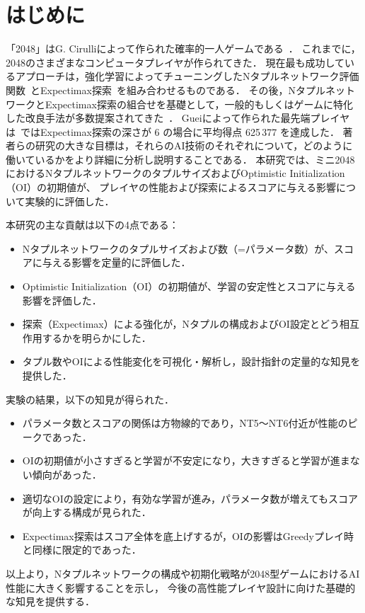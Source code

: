 \section{はじめに}
「2048」はG. Cirulliによって作られた確率的一人ゲームである~\cite{2048}．
これまでに，2048のさまざまなコンピュータプレイヤが作られてきた．
現在最も成功しているアプローチは，強化学習によってチューニングしたNタプルネットワーク評価関数~\cite{SzJa14}とExpectimax探索~\cite{YWHC16}を組み合わせるものである．
その後，NタプルネットワークとExpectimax探索の組合せを基礎として，一般的もしくはゲームに特化した改良手法が多数提案されてきた~\cite{YWHC16,Mats17,Jask17,GuCW22}．
Gueiによって作られた最先端プレイヤは~\cite{GuCW22}ではExpectimax探索の深さが 6 の場合に平均得点 625\,377 を達成した．
著者らの研究の大きな目標は，それらのAI技術のそれぞれについて，どのように働いているかをより詳細に分析し説明することである．
本研究では、ミニ2048におけるNタプルネットワークのタプルサイズおよびOptimistic Initialization（OI）の初期値が、
プレイヤの性能および探索によるスコアに与える影響について実験的に評価した．

\vspace{0.5em}
\noindent 本研究の主な貢献は以下の4点である：
\begin{itemize}
\item Nタプルネットワークのタプルサイズおよび数（=パラメータ数）が、スコアに与える影響を定量的に評価した．
\item Optimistic Initialization（OI）の初期値が、学習の安定性とスコアに与える影響を評価した．
\item 探索（Expectimax）による強化が，Nタプルの構成およびOI設定とどう相互作用するかを明らかにした．
\item タプル数やOIによる性能変化を可視化・解析し，設計指針の定量的な知見を提供した．
\end{itemize}

実験の結果，以下の知見が得られた．
\begin{itemize}
\item パラメータ数とスコアの関係は方物線的であり，NT5～NT6付近が性能のピークであった．
\item OIの初期値が小さすぎると学習が不安定になり，大きすぎると学習が進まない傾向があった．
\item 適切なOIの設定により，有効な学習が進み，パラメータ数が増えてもスコアが向上する構成が見られた．
\item Expectimax探索はスコア全体を底上げするが，OIの影響はGreedyプレイ時と同様に限定的であった．
\end{itemize}

以上より，Nタプルネットワークの構成や初期化戦略が2048型ゲームにおけるAI性能に大きく影響することを示し，
今後の高性能プレイヤ設計に向けた基礎的な知見を提供する．
